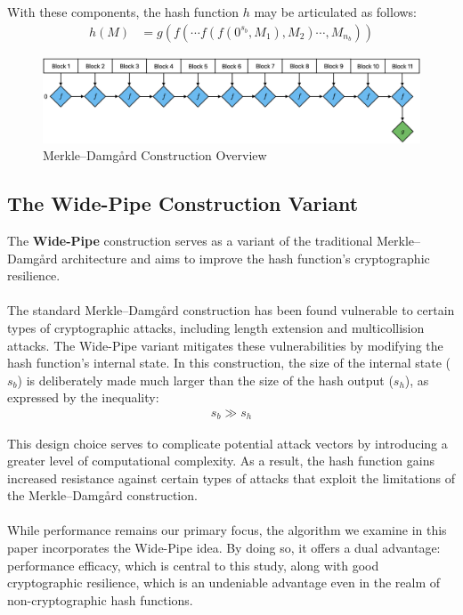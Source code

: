 \documentclass[10pt]{article}
\begin{document}
With these components, the hash function \( h \) may be articulated as follows:
\begin{align*}
    h(M) &= g\left( f(\cdots f(f(0^{s_b}, M_1), M_2) \cdots, M_{n_b}) \right)
\end{align*}

\begin{figure}[H]
\centering
\includegraphics[width=1\textwidth]{linear-construction.png}
\caption{Merkle–Damgård Construction Overview}
\label{fig:linear-construction}
\end{figure}

\clearpage
\subsection{The Wide-Pipe Construction Variant} \label{widepipe}

The \textbf{Wide-Pipe} construction serves as a variant of the traditional Merkle–Damgård architecture and aims to improve the hash function's cryptographic resilience.\\\\
The standard Merkle–Damgård construction has been found vulnerable to certain types of cryptographic attacks, including length extension and multicollision attacks. The Wide-Pipe variant mitigates these vulnerabilities by modifying the hash function's internal state.
In this construction, the size of the internal state (\(s_b\)) is deliberately made much larger than the size of the hash output
(\(s_h\)), as expressed by the inequality:
\begin{align*}
    s_b \gg s_h
\end{align*}

This design choice serves to complicate potential attack vectors by introducing a greater level of computational complexity.
As a result, the hash function gains increased resistance against certain types of attacks that exploit the limitations of the Merkle–Damgård construction.\\\\
While performance remains our primary focus, the algorithm we examine in this paper incorporates the Wide-Pipe idea. By doing so, it offers a dual advantage: performance efficacy, which is central to this study, along with good cryptographic resilience, which is an undeniable advantage even in the realm of non-cryptographic hash functions.
\end{document}
